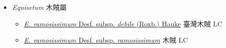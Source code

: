 
  \begin{itemize}
 \item[    ] \textit{Equisetum} 木賊屬
                                
  \begin{itemize}
        \item[] \href{http://www.theplantlist.org/tpl1.1/search?q=Equisetum+ramosissimum+subsp.+debile}{\textit{E. ramosissimum} Desf. subsp. \textit{debile} (Roxb.) Hauke}  
                                        臺灣木賊   LC
        \item[] \href{http://www.theplantlist.org/tpl1.1/search?q=Equisetum+ramosissimum+subsp.+ramosissimum}{\textit{E. ramosissimum} Desf. subsp. \textit{ramosissimum}}  
                                        木賊   LC
  \end{itemize}
  \end{itemize}
